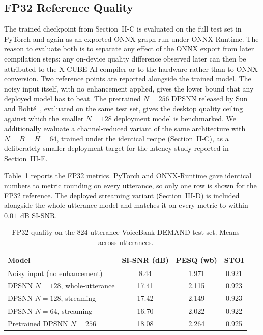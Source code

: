 \documentclass[conference]{IEEEtran}
\begin{document}
\subsection{FP32 Reference Quality}
The trained checkpoint from Section~II-C is evaluated on the full test set in PyTorch and again as an exported ONNX graph run under ONNX Runtime. The reason to evaluate both is to separate any effect of the ONNX export from later compilation steps: any on-device quality difference observed later can then be attributed to the X-CUBE-AI compiler or to the hardware rather than to ONNX conversion. Two reference points are reported alongside the trained model. The noisy input itself, with no enhancement applied, gives the lower bound that any deployed model has to beat. The pretrained $N=256$ DPSNN released by Sun and Boht\'e~\cite{b4}, evaluated on the same test set, gives the desktop quality ceiling against which the smaller $N=128$ deployment model is benchmarked. We additionally evaluate a channel-reduced variant of the same architecture with $N=B=H=64$, trained under the identical recipe (Section~II-C), as a deliberately smaller deployment target for the latency study reported in Section~III-E. 


Table~\ref{tab:fp32-ref} reports the FP32 metrics. PyTorch and ONNX-Runtime gave identical numbers to metric rounding on every utterance, so only one row is shown for the FP32 reference. The deployed streaming variant (Section~III-D) is included alongside the whole-utterance model and matches it on every metric to within $0.01$~dB SI-SNR.

\begin{table}[!ht]
\caption{FP32 quality on the 824-utterance VoiceBank-DEMAND test set. Means across utterances.}
\label{tab:fp32-ref}
\centering
\setlength{\tabcolsep}{3pt} 
\begin{tabular}{lccc}
\hline
\textbf{Model} & \textbf{SI-SNR (dB)} & \textbf{PESQ (wb)} & \textbf{STOI} \\
\hline
Noisy input (no enhancement) & 8.44 & 1.971 & 0.921 \\
DPSNN $N=128$, whole-utterance & 17.41 & 2.115 & 0.923 \\
DPSNN $N=128$, streaming & 17.42 & 2.149 & 0.923 \\
DPSNN $N=64$, streaming & 16.70 & 2.022 & 0.922 \\
Pretrained DPSNN $N=256$~\cite{b4} & 18.08 & 2.264 & 0.925 \\
\hline
\end{tabular}
\end{table}
\end{document}
